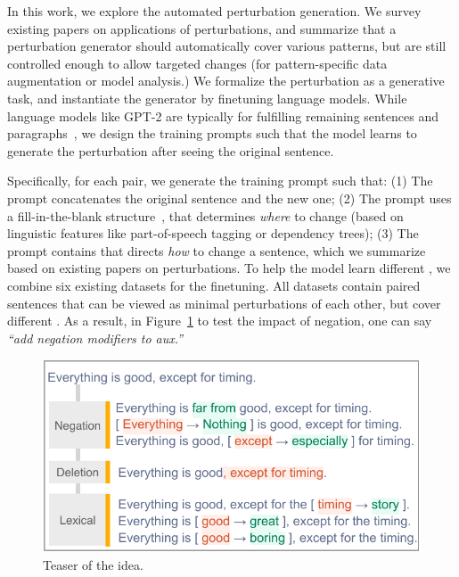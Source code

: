 In this work, we explore the automated perturbation generation.
We survey existing papers on applications of perturbations, and summarize that a perturbation generator should automatically cover various patterns, but are still controlled enough to allow targeted changes (for pattern-specific data augmentation or model analysis.)
We formalize the perturbation as a generative task, and instantiate the generator by finetuning language models.
While language models like GPT-2 are typically for fulfilling remaining sentences and paragraphs~\cite{radford2019language}, we design the training prompts such that the model learns to generate the perturbation after seeing the original sentence.

Specifically, for each pair, we generate the training prompt such that:
(1) The prompt concatenates the original sentence and the new one;  
(2) The prompt uses a fill-in-the-blank structure~\cite{donahue2020enabling}, that determines \emph{where} to change (based on linguistic features like part-of-speech tagging or dependency trees);
(3) The prompt contains \tagstrs that directs \emph{how} to change a sentence, which we summarize based on existing papers on perturbations.
To help the model learn different \tagstrs, we combine six existing datasets for the finetuning.
All datasets contain paired sentences that can be viewed as minimal perturbations of each other, but cover different \tagstrs.
As a result, in Figure~\ref{fig:teaser} to test the impact of negation, one can say \emph{``add negation modifiers to aux.''}

\begin{figure}[t]
\centering
\includegraphics[width=1\columnwidth]{figures/teaser}
\vspace{-15pt}
\caption{Teaser of the idea. }
\vspace{-10pt}
\label{fig:teaser}
\end{figure}


